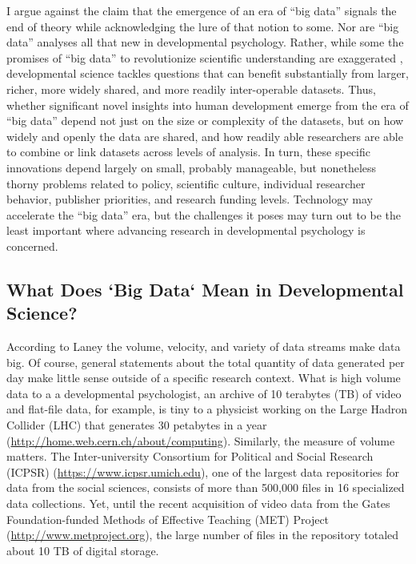 \documentclass[letterpaper,man,apacite]{apa6}
\begin{document}
I argue against the claim that the emergence of an era of ``big data'' signals the end of theory \cite{anderson_end_2008} while acknowledging the lure of that notion to some.
Nor are ``big data'' analyses all that new in developmental psychology.
Rather, while some the promises of ``big data'' to revolutionize scientific understanding are exaggerated \cite{boyd_critical_2012}, developmental science tackles questions that can benefit substantially from larger, richer, more widely shared, and more readily inter-operable datasets.
Thus, whether significant novel insights into human development emerge from the era of ``big data'' depend not just on the size or complexity of the datasets, but on how widely and openly the data are shared, and how readily able researchers are able to combine or link datasets across levels of analysis.
In turn, these specific innovations depend largely on small, probably manageable, but nonetheless thorny problems related to policy, scientific culture, individual researcher behavior, publisher priorities, and research funding levels.
Technology may accelerate the ``big data'' era, but the challenges it poses may turn out to be the least important where advancing research in developmental psychology is concerned.

\subsection{What Does `Big Data` Mean in Developmental Science?}

According to Laney \citeyear{laney01controlling3v} the volume, velocity, and variety of data streams make data big.
Of course, general statements about the total quantity of data generated per day \cite{ibm_2015} make little sense outside of a specific research context.
What is high volume data to a a developmental psychologist, an archive of 10 terabytes (TB) of video and flat-file data, for example, is tiny to a physicist working on the Large Hadron Collider (LHC) that generates 30 petabytes in a year (\url{http://home.web.cern.ch/about/computing}).
Similarly, the measure of volume matters.
The Inter-university Consortium for Political and Social Research (ICPSR) (\url{https://www.icpsr.umich.edu}), one of the largest data repositories for data from the social sciences, consists of more than 500,000 files in 16 specialized data collections.
Yet, until the recent acquisition of video data from the Gates Foundation-funded Methods of Effective Teaching (MET) Project (\url{http://www.metproject.org}), the large number of files in the repository totaled about 10 TB of digital storage.
\end{document}
